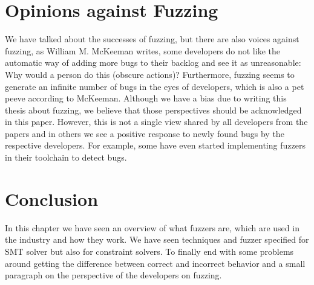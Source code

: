 \section{Opinions against Fuzzing}
\label{fuzzing:OpinionsAgainstFuzzing}
We have talked about the successes of fuzzing, but there are also voices against fuzzing, as William M. McKeeman \cite{39differentialTesting} writes, some developers do not like the automatic way of adding more bugs to their backlog and see it as unreasonable: Why would a person do this (obscure actions)? Furthermore, fuzzing seems to generate an infinite number of bugs in the eyes of developers, which is also a pet peeve according to McKeeman. 
Although we have a bias due to writing this thesis about fuzzing, we believe that those perspectives should be acknowledged in this paper. However, this is not a single view shared by all developers from the papers \cite{43YinYang, 42FalconFuzzingConfigurationSettingsAndNormal, 47zhang2019finding} and in others we see a positive response to newly found bugs by the respective developers. For example, some have even started implementing fuzzers \cite{44Stringfuzz} in their toolchain to detect bugs.

\section{Conclusion}
\label{fuzzing:conclusion}
In this chapter we have seen an overview of what fuzzers are, which are used in the industry and how they work. We have seen techniques and fuzzer specified for SMT solver but also for constraint solvers. To finally end with some problems around getting the difference between correct and incorrect behavior and a small paragraph on the perspective of the developers on fuzzing.

